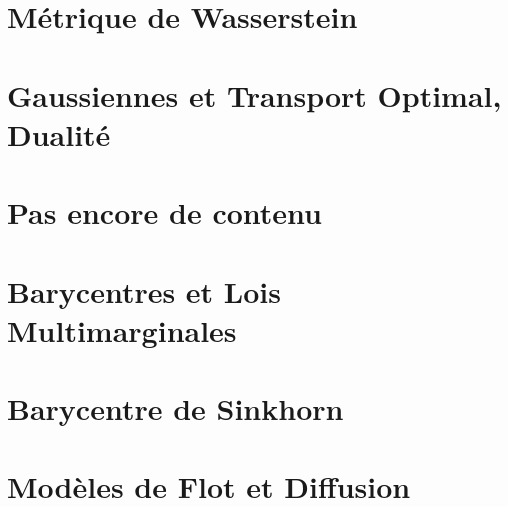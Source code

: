 \documentclass[info, math, french]{mpb-cours}
\begin{document}
\section{Métrique de Wasserstein}

\section{Gaussiennes et Transport Optimal, Dualité}

\section{Pas encore de contenu}

\section{Barycentres et Lois Multimarginales}

\section{Barycentre de Sinkhorn}

\section{Modèles de Flot et Diffusion}
\end{document}
